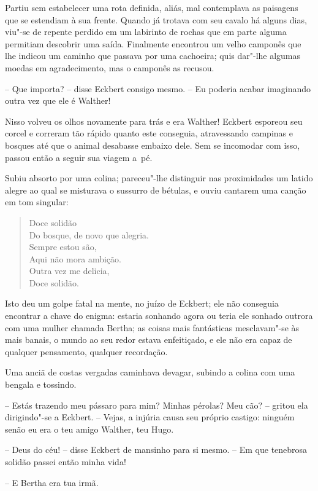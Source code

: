  Partiu sem estabelecer uma rota definida, aliás, mal contemplava as
paisagens que se estendiam à sua frente. Quando já trotava com seu
cavalo há alguns dias, viu"-se de repente perdido em um labirinto de
rochas que em parte alguma permitiam descobrir uma saída. Finalmente
encontrou um velho camponês que lhe indicou um caminho que passava por
uma cachoeira; quis dar"-lhe algumas moedas em agradecimento, mas o
camponês as recusou.

-- Que importa? -- disse Eckbert consigo mesmo. -- Eu poderia acabar
imaginando outra vez que ele é Walther!

Nisso volveu os olhos novamente para trás e era Walther! Eckbert
esporeou seu corcel e correram tão rápido quanto este conseguia,
atravessando campinas e bosques até que o animal desabasse embaixo
dele. Sem se incomodar com isso, passou então a seguir sua viagem \mbox{a pé.}

 Subiu absorto por uma colina; pareceu"-lhe distinguir nas proximidades
um latido alegre ao qual se misturava o sussurro de bétulas, e ouviu
cantarem uma canção em tom singular:

\begin{verse}
Doce solidão\\
Do bosque, de novo que alegria.\\
Sempre estou são,\\
Aqui não mora ambição.\\
Outra vez me delicia,\\
Doce solidão.
\end{verse}


 Isto deu um golpe fatal na mente, no juízo de Eckbert; ele não
conseguia encontrar a chave do enigma: estaria sonhando agora ou teria
ele sonhado outrora com uma mulher chamada Bertha; as coisas mais
fantásticas mesclavam"-se às mais banais, o mundo ao seu redor estava
enfeitiçado, e ele não era capaz de qualquer pensamento, qualquer
recordação.

 Uma anciã de costas vergadas caminhava devagar, subindo a colina com
uma bengala e tossindo.

-- Estás trazendo meu pássaro para mim? Minhas pérolas? Meu cão? --
gritou ela dirigindo"-se a Eckbert. -- Vejas, a injúria causa seu próprio
castigo: ninguém senão eu era o teu amigo Walther, teu Hugo.

 -- Deus do céu! -- disse Eckbert de mansinho para si mesmo. -- Em que
tenebrosa solidão passei então minha vida!

 -- E Bertha era tua irmã.

